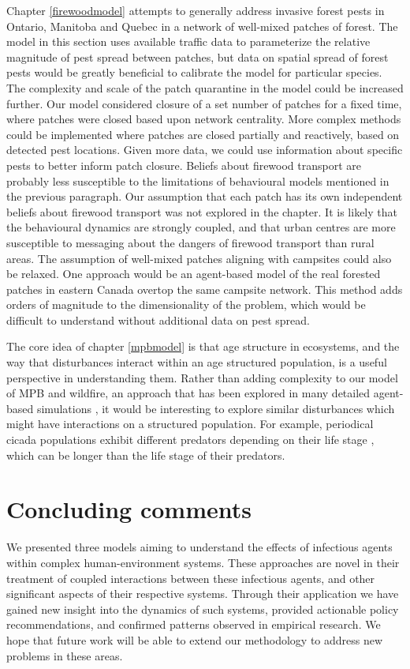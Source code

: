 Chapter \ref{firewoodmodel} attempts to generally address invasive forest pests in Ontario, Manitoba and Quebec in a network of well-mixed patches of forest. The model in this section uses available traffic data to parameterize the relative magnitude of pest spread between patches, but data on spatial spread of forest pests would be greatly beneficial to calibrate the model for particular species. The complexity and scale of the patch quarantine in the model could be increased further. Our model considered closure of a set number of patches for a fixed time, where patches were closed based upon network centrality. More complex methods could be implemented where patches are closed partially and reactively, based on detected pest locations. Given more data, we could use information about specific pests to better inform patch closure. Beliefs about firewood transport are probably less susceptible to the limitations  of behavioural models mentioned in the previous paragraph. Our assumption that each patch has its own independent beliefs about firewood transport was not explored in the chapter. It is likely that the behavioural dynamics are strongly coupled, and that urban centres are more susceptible to messaging about the dangers of firewood transport than rural areas. The assumption of well-mixed patches aligning with campsites could also be relaxed. One approach would be an agent-based model of the real forested patches in eastern Canada overtop the same campsite network. This method adds orders of magnitude to the dimensionality of the problem, which would be difficult to understand without additional data on pest spread.  

The core idea of chapter \ref{mpbmodel} is that age structure in ecosystems, and the way that disturbances interact within an age structured population, is a useful perspective in understanding them. Rather than adding complexity to our model of MPB and wildfire, an approach that has been explored in many detailed agent-based simulations \cite{caldwell2013simulated,perrakis2014modeling,ager2007modeling,loehman2017interactions}, it would be interesting to explore similar disturbances which might have interactions on a structured population. For example, periodical cicada populations exhibit different predators depending on their life stage \cite{lloyd1966periodical}, which can be longer than the life stage of their predators. 

\section{Concluding comments}

We presented three models aiming to understand the effects of infectious agents within complex human-environment systems. These approaches are novel in their treatment of coupled interactions between these infectious agents, and other significant aspects of their respective systems. Through their application we have gained new insight into the dynamics of such systems, provided actionable policy recommendations, and confirmed patterns observed in empirical research. We hope that future work will be able to extend our methodology to address new problems in these areas.